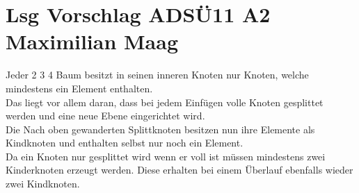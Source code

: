 \documentclass{article}
\begin{document}
	\section*{Lsg Vorschlag ADSÜ11 A2 Maximilian Maag}
	Jeder 2 3 4 Baum besitzt in seinen inneren Knoten nur Knoten, welche mindestens ein Element enthalten. \\
	Das liegt vor allem daran, dass bei jedem Einfügen volle Knoten gesplittet werden und eine neue Ebene eingerichtet wird. \\
	Die Nach oben gewanderten Splittknoten besitzen nun ihre Elemente als Kindknoten und enthalten selbst nur noch ein Element. \\
	Da ein Knoten nur gesplittet wird wenn er voll ist müssen mindestens zwei Kinderknoten erzeugt werden. Diese erhalten bei einem Überlauf ebenfalls wieder zwei Kindknoten.
\end{document}
